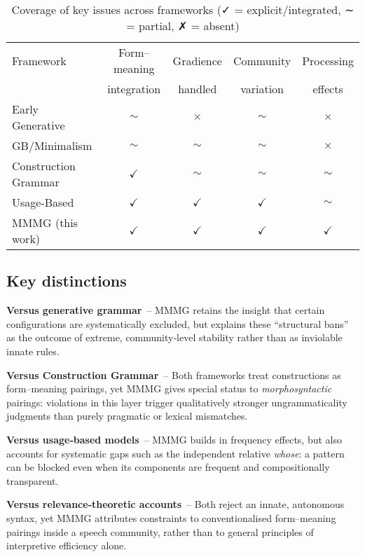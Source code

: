 \documentclass[12pt]{article}
\begin{document}
\begin{table}[h]
\centering
\small
\caption{Coverage of key issues across frameworks (✓ = explicit/integrated, ∼ = partial, ✗ = absent)}
\begin{tabular}{@{}lcccc@{}}
\toprule
Framework & Form–meaning & Gradience & Community & Processing \\
          & integration  & handled   & variation & effects \\
\midrule
Early Generative     & $\sim$ & $\times$ & $\sim$ & $\times$ \\
GB/Minimalism        & $\sim$ & $\sim$   & $\sim$ & $\times$ \\
Construction Grammar & $\checkmark$ & $\sim$ & $\sim$ & $\sim$ \\
Usage-Based          & $\checkmark$ & $\checkmark$ & $\checkmark$ & $\sim$ \\
MMMG (this work)     & $\checkmark$ & $\checkmark$ & $\checkmark$ & $\checkmark$ \\
\bottomrule
\end{tabular}
\end{table}


\subsection{Key distinctions}

\textbf{Versus generative grammar}~--  
MMMG retains the insight that certain configurations are systematically excluded, but explains these \enquote{structural bans} as the outcome of extreme, community‑level stability rather than as inviolable innate rules.

\textbf{Versus Construction Grammar}~--  
Both frameworks treat constructions as form–meaning pairings, yet MMMG gives special status to \emph{morphosyntactic} pairings: violations in this layer trigger qualitatively stronger ungrammaticality judgments than purely pragmatic or lexical mismatches.

\textbf{Versus usage‑based models}~--  
MMMG builds in frequency effects, but also accounts for systematic gaps such as the independent relative \textit{whose}: a pattern can be blocked even when its components are frequent and compositionally transparent.

\textbf{Versus relevance‑theoretic accounts}~--  
Both reject an innate, autonomous syntax, yet MMMG attributes constraints to conventionalised form–meaning pairings inside a speech community, rather than to general principles of interpretive efficiency alone.
\end{document}
